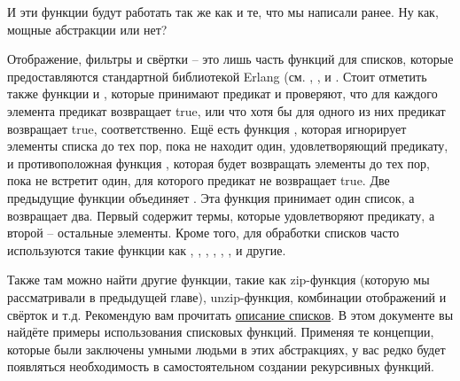 И эти функции будут работать так же как и те, что мы написали ранее. Ну как, мощные абстракции или нет?

Отображение, фильтры и свёртки \--- это лишь часть функций для списков, которые предоставляются стандартной библиотекой Erlang (см. , ,  и . Стоит отметить также функции  и , которые принимают предикат и проверяют, что для каждого элемента предикат возвращает true, или что хотя бы для одного из них предикат возвращает true, соответственно. Ещё есть функция , которая игнорирует элементы списка до тех пор, пока не находит один, удовлетворяющий предикату, и противоположная функция , которая будет возвращать элементы до тех пор, пока не встретит один, для которого предикат не возвращает true. Две предыдущие функции объединяет . Эта функция принимает один список, а возвращает два. Первый содержит термы, которые удовлетворяют предикату, а второй \--- остальные элементы. Кроме того, для обработки списков часто используются такие функции как , , , , , ,  и другие.

Также там можно найти другие функции, такие как zip\--функция (которую мы рассматривали в предыдущей главе), unzip\--функция, комбинации отображений и свёрток и т.д. Рекомендую вам прочитать \href{http://erldocs.com/R15B/stdlib/lists.html}{описание списков}. В этом документе вы найдёте примеры использования списковых функций. Применяя те концепции, которые были заключены умными людьми в этих абстракциях, у вас редко будет появляться необходимость в самостоятельном создании рекурсивных функций.
